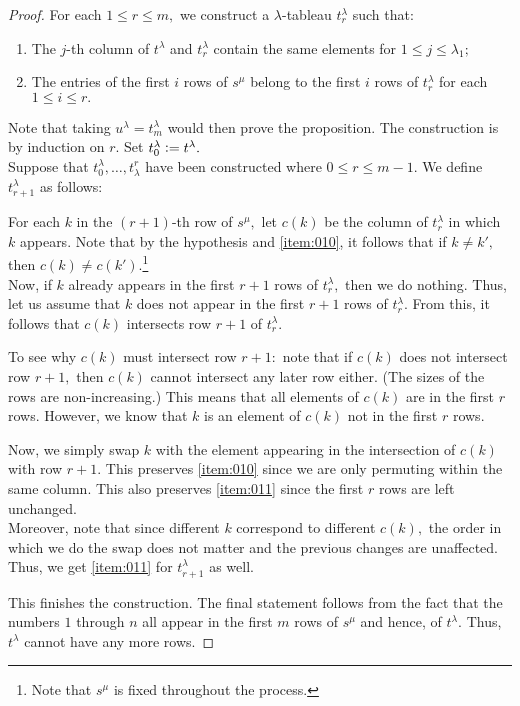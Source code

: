 \begin{proof} 
	For each $1 \le r \le m,$ we construct a $\lambda$-tableau $t_r^\lambda$ such that:
	\begin{enumerate}[label = (\alph*')]
		\item \label{item:010} The $j$-th column of $t^\lambda$ and $t_r^\lambda$ contain the same elements for $1 \le j \le \lambda_1;$
		\item \label{item:011} The entries of the first $i$ rows of $s^\mu$ belong to the first $i$ rows of $t_r^\lambda$ for each $1 \le i \le r.$
	\end{enumerate}
	Note that taking $u^\lambda = t_m^\lambda$ would then prove the proposition. The construction is by induction on $r.$ Set $t_0^\lambda \vcentcolon= t^\lambda.$ \\
	Suppose that $t_0^\lambda, \ldots, t^r_\lambda$ have been constructed where $0 \le r \le m - 1.$ We define $t_{r+1}^\lambda$ as follows:

	For each $k$ in the $(r + 1)$-th row of $s^\mu,$ let $c(k)$ be the column of $t_r^\lambda$ in which $k$ appears. Note that by the hypothesis and \ref{item:010}, it follows that if $k \neq k',$ then $c(k) \neq c(k').$\footnote{Note that $s^\mu$ is fixed throughout the process.}\\
	Now, if $k$ already appears in the first $r + 1$ rows of $t_r^\lambda,$ then we do nothing. Thus, let us assume that $k$ does not appear in the first $r + 1$ rows of $t_r^\lambda.$ From this, it follows that $c(k)$ intersects row $r + 1$ of $t_r^\lambda.$\\
	
	\begin{blockquote}
		To see why $c(k)$ must intersect row $r + 1:$ note that if $c(k)$ does not intersect row $r + 1,$ then $c(k)$ cannot intersect any later row either. (The sizes of the rows are non-increasing.) This means that all elements of $c(k)$ are in the first $r$ rows. However, we know that $k$ is an element of $c(k)$ not in the first $r$ rows.
	\end{blockquote}

	Now, we simply swap $k$ with the element appearing in the intersection of $c(k)$ with row $r + 1.$ This preserves \ref{item:010} since we are only permuting within the same column. This also preserves \ref{item:011} since the first $r$ rows are left unchanged. \\
	Moreover, note that since different $k$ correspond to different $c(k),$ the order in which we do the swap does not matter and the previous changes are unaffected. Thus, we get \ref{item:011} for $t^\lambda_{r + 1}$ as well.

	This finishes the construction. The final statement follows from the fact that the numbers $1$ through $n$ all appear in the first $m$ rows of $s^\mu$ and hence, of $t^\lambda.$ Thus, $t^\lambda$ cannot have any more rows.
\end{proof}
